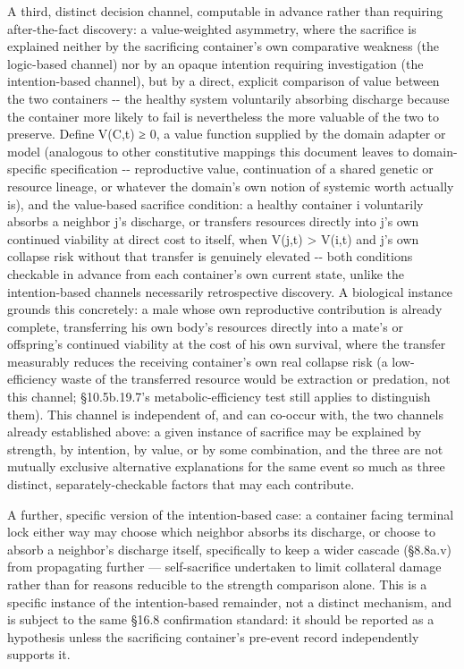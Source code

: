 \documentclass[
]{article}
\begin{document}
A third, distinct decision channel, computable in advance rather than
requiring after-the-fact discovery: a value-weighted asymmetry, where
the sacrifice is explained neither by the sacrificing container's own
comparative weakness (the logic-based channel) nor by an opaque
intention requiring investigation (the intention-based channel), but by
a direct, explicit comparison of value between the two containers -\/-
the healthy system voluntarily absorbing discharge because the container
more likely to fail is nevertheless the more valuable of the two to
preserve. Define V(C,t) ≥ 0, a value function supplied by the domain
adapter or model (analogous to other constitutive mappings this document
leaves to domain-specific specification -\/- reproductive value,
continuation of a shared genetic or resource lineage, or whatever the
domain's own notion of systemic worth actually is), and the value-based
sacrifice condition: a healthy container i voluntarily absorbs a
neighbor j's discharge, or transfers resources directly into j's own
continued viability at direct cost to itself, when V(j,t) \textgreater{}
V(i,t) and j's own collapse risk without that transfer is genuinely
elevated -\/- both conditions checkable in advance from each container's
own current state, unlike the intention-based channels necessarily
retrospective discovery. A biological instance grounds this concretely:
a male whose own reproductive contribution is already complete,
transferring his own body's resources directly into a mate's or
offspring's continued viability at the cost of his own survival, where
the transfer measurably reduces the receiving container's own real
collapse risk (a low-efficiency waste of the transferred resource would
be extraction or predation, not this channel; §10.5b.19.7's
metabolic-efficiency test still applies to distinguish them). This
channel is independent of, and can co-occur with, the two channels
already established above: a given instance of sacrifice may be
explained by strength, by intention, by value, or by some combination,
and the three are not mutually exclusive alternative explanations for
the same event so much as three distinct, separately-checkable factors
that may each contribute.

A further, specific version of the intention-based case: a container
facing terminal lock either way may choose which neighbor absorbs its
discharge, or choose to absorb a neighbor's discharge itself,
specifically to keep a wider cascade (§8.8a.v) from propagating further
--- self-sacrifice undertaken to limit collateral damage rather than for
reasons reducible to the strength comparison alone. This is a specific
instance of the intention-based remainder, not a distinct mechanism, and
is subject to the same §16.8 confirmation standard: it should be
reported as a hypothesis unless the sacrificing container's pre-event
record independently supports it.
\end{document}
